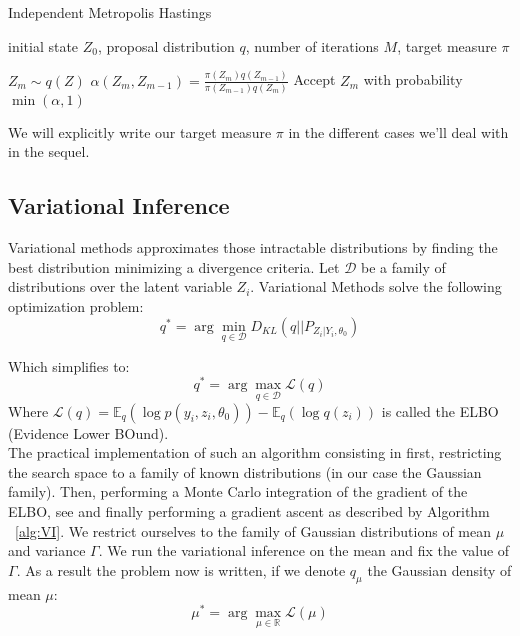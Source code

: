 \documentclass{article}
\begin{document}
\begin{algorithm}[h]
   \caption{Independent Metropolis Hastings}
   \label{alg:IMH}
\begin{algorithmic}
    initial state $Z_0$, proposal distribution $q$, number of iterations $M$, target measure $\pi$


   \STATE $Z_m \sim q(Z)$
   \STATE $\alpha(Z_m,Z_{m-1}) = \frac{\pi(Z_m) q(Z_{m-1})}{\pi(Z_{m-1}) q(Z_{m})}$
   \STATE Accept $Z_m$ with probability $\min(\alpha,1)$
   \ENDFOR

\end{algorithmic}
\end{algorithm}

We will explicitly write our target measure $\pi$ in the different cases we'll deal with in the sequel.\\

\subsection{Variational Inference}
Variational methods approximates those intractable distributions by finding the best distribution minimizing a divergence criteria. Let $\mathcal{D}$ be a family of distributions over the latent variable $Z_i$. Variational Methods solve the following optimization problem:
\begin{equation}
q^* = \arg \min \limits_{q \in \mathcal{D}} D_{KL}(q||P_{Z_i|Y_i,\theta_0})
\end{equation}

Which simplifies to:
\begin{equation}
q^* = \arg \max \limits_{q \in \mathcal{D}} \mathcal{L}(q)
\end{equation}
Where $\mathcal{L}(q) = \mathbb{E}_q(\log p(y_i,z_i,\theta_0)) - \mathbb{E}_q(\log q(z_i))$ is called the ELBO (Evidence Lower BOund).\\

The practical implementation of such an algorithm consisting in first, restricting the search space to a family of known distributions (in our case the Gaussian family). Then, performing a Monte Carlo integration of the gradient of the ELBO, see \citep{ranganath} and finally performing a gradient ascent  as described by Algorithm ~\ref{alg:VI}. We restrict ourselves to the family of Gaussian distributions of mean $\mu$ and variance $\Gamma$. We run the variational inference on the mean and fix the value of $\Gamma$. As a result the problem now is written, if we denote $q_{\mu}$ the Gaussian density of mean $\mu$:
\begin{equation}
\mu^* = \arg \max \limits_{\mu \in \mathbb{R}} \mathcal{L}(\mu)
\end{equation}
\end{document}
